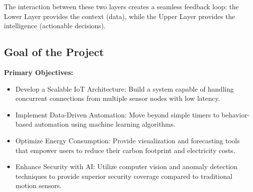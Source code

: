 The interaction between these two layers creates a seamless feedback loop: the Lower Layer provides the context (data), while the Upper Layer provides the intelligence (actionable decisions).




\subsection{Goal of the Project}

\textbf{Primary Objectives:}
\begin{itemize}
    \item Develop a Scalable IoT Architecture: Build a system capable of handling concurrent connections from multiple sensor nodes with low latency.
    \item Implement Data-Driven Automation: Move beyond simple timers to behavior-based automation using machine learning algorithms.
    \item Optimize Energy Consumption: Provide visualization and forecasting tools that empower users to reduce their carbon footprint and electricity costs.
    \item Enhance Security with AI: Utilize computer vision and anomaly detection techniques to provide superior security coverage compared to traditional motion sensors.
\end{itemize}

